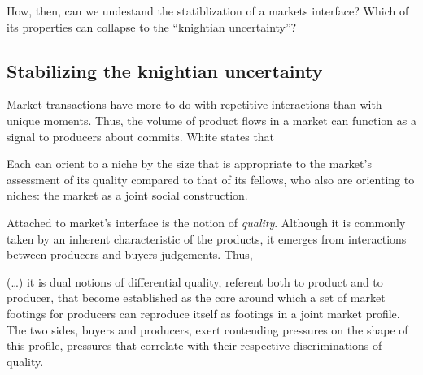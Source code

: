 \documentclass[a4paper, 12pt, openright, oneside, german, french, brazil, english, article]{abntex2}
\begin{document}
	How, then, can we undestand the statiblization of a markets interface? Which of its properties can collapse to the ``knightian uncertainty''?
	


	\subsection{Stabilizing the knightian uncertainty}
	
	
	Market transactions have more to do with repetitive interactions than with unique moments. Thus, the volume of product flows in a market can function as a signal to producers about commits. White states that
	
	\begin{citacao}
		Each can orient to a niche by the size that is appropriate to the market's assessment of its quality compared to that of its fellows, who also are orienting to niches: the market as a joint social construction. \cite[p. 10]{white2002markets}
	\end{citacao}
	
	
	Attached to market's interface is the notion of \textit{quality}. Although it is commonly taken by an inherent characteristic of the products, it emerges from interactions between producers and buyers judgements. Thus, 
	
	\begin{citacao}
	(\dots) it is dual notions of differential quality, referent both to product and to producer, that become established as the core around which a set of market footings for producers can reproduce itself as footings in a joint market profile. The two sides, buyers and producers, exert contending pressures on the shape of this profile, pressures that correlate with their respective discriminations of quality. \cite[p. 10]{white2002markets}
	\end{citacao}
	
\end{document}
